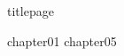 \documentclass[
	,a4paper
	,12pt
	,oneside
]{book}
\begin{document}
\frontmatter
	{titlepage}
	\restoregeometry
	\tableofcontents

\mainmatter

	{chapter01}
	{chapter05}


\backmatter
\end{document}
